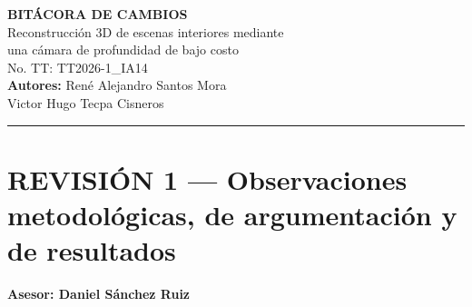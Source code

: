 \documentclass[12pt, a4paper]{article}
\begin{document}
\begin{center}
{\LARGE \textbf{BITÁCORA DE CAMBIOS}}\\[1.5em]

{\large Reconstrucción 3D de escenas interiores mediante\\[0.2em]
una cámara de profundidad de bajo costo}\\[1em]

{\normalsize No. TT: TT2026-1\_IA14}\\[1em]

{\normalsize \textbf{Autores:} René Alejandro Santos Mora\\[0.2em]
Victor Hugo Tecpa Cisneros}
\end{center}

\vspace{1em}
\hrule
\vspace{1em}


\section*{REVISIÓN 1 — Observaciones metodológicas, de argumentación y de resultados}
\vspace{0.3em}
\begin{center}
\textbf{Asesor: Daniel Sánchez Ruiz}
\end{center}
\vspace{0.5em}
\end{document}

